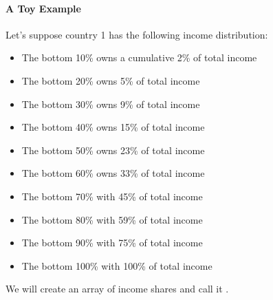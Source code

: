 \documentclass[letterpaper,10pt,english]{jupyterBook}
\begin{document}
\paragraph{A Toy Example}
\label{\detokenize{content/06-inequality/inequality:a-toy-example}}
\sphinxAtStartPar
Let’s suppose country 1 has the following income distribution:
\begin{itemize}
\item {} 
\sphinxAtStartPar
The bottom 10\% owns a cumulative 2\% of total income

\item {} 
\sphinxAtStartPar
The bottom 20\% owns 5\% of total income

\item {} 
\sphinxAtStartPar
The bottom 30\% owns 9\% of total income

\item {} 
\sphinxAtStartPar
The bottom 40\% owns 15\% of total income

\item {} 
\sphinxAtStartPar
The bottom 50\% owns 23\% of total income

\item {} 
\sphinxAtStartPar
The bottom 60\% owns 33\% of total income

\item {} 
\sphinxAtStartPar
The bottom 70\% with 45\% of total income

\item {} 
\sphinxAtStartPar
The bottom 80\% with 59\% of total income

\item {} 
\sphinxAtStartPar
The bottom 90\% with 75\% of total income

\item {} 
\sphinxAtStartPar
The bottom 100\% with 100\% of total income

\end{itemize}

\sphinxAtStartPar
We will create an array of income shares and call it .

\begin{sphinxVerbatim}[commandchars=\\\{\}]
            
\end{sphinxVerbatim}
\end{document}
